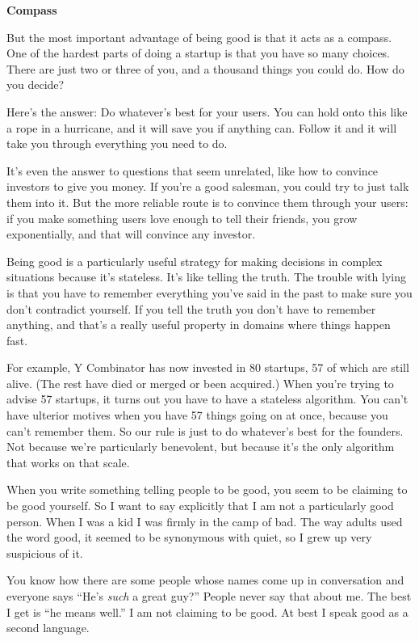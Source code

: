 \textbf{Compass}

But the most important advantage of being good is that it acts as a
compass. One of the hardest parts of doing a startup is that you have so
many choices. There are just two or three of you, and a thousand things
you could do. How do you decide?

Here's the answer: Do whatever's best for your users. You can hold onto
this like a rope in a hurricane, and it will save you if anything can.
Follow it and it will take you through everything you need to do.

It's even the answer to questions that seem unrelated, like how to
convince investors to give you money. If you're a good salesman, you
could try to just talk them into it. But the more reliable route is to
convince them through your users: if you make something users love
enough to tell their friends, you grow exponentially, and that will
convince any investor.

Being good is a particularly useful strategy for making decisions in
complex situations because it's stateless. It's like telling the truth.
The trouble with lying is that you have to remember everything you've
said in the past to make sure you don't contradict yourself. If you tell
the truth you don't have to remember anything, and that's a really
useful property in domains where things happen fast.

For example, Y Combinator has now invested in 80 startups, 57 of which
are still alive. (The rest have died or merged or been acquired.) When
you're trying to advise 57 startups, it turns out you have to have a
stateless algorithm. You can't have ulterior motives when you have 57
things going on at once, because you can't remember them. So our rule is
just to do whatever's best for the founders. Not because we're
particularly benevolent, but because it's the only algorithm that works
on that scale.

When you write something telling people to be good, you seem to be
claiming to be good yourself. So I want to say explicitly that I am not
a particularly good person. When I was a kid I was firmly in the camp of
bad. The way adults used the word good, it seemed to be synonymous with
quiet, so I grew up very suspicious of it.

You know how there are some people whose names come up in conversation
and everyone says ``He's \emph{such} a great guy?'' People never say
that about me. The best I get is ``he means well.'' I am not claiming to
be good. At best I speak good as a second language.

